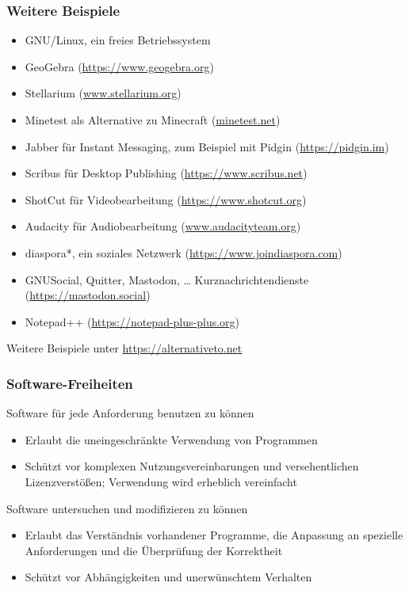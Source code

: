 \documentclass{beamer}
\begin{document}
\begin{frame}
  \frametitle{Weitere Beispiele}

  \onslide<+->

  \begin{itemize}
  \item GNU/Linux, ein freies Betriebssystem %
  \item GeoGebra (\url{https://www.geogebra.org})
  \item Stellarium (\url{www.stellarium.org})
  \item Minetest als Alternative zu Minecraft (\url{minetest.net})
  \item Jabber für Instant Messaging, zum Beispiel mit Pidgin
    (\url{https://pidgin.im})
  \item Scribus für Desktop Publishing (\url{https://www.scribus.net})
  \item ShotCut für Videobearbeitung (\url{https://www.shotcut.org})
  \item Audacity für Audiobearbeitung (\url{www.audacityteam.org})
  \item diaspora*, ein soziales Netzwerk (\url{https://www.joindiaspora.com})
  \item GNUSocial, Quitter, Mastodon, \dots{} Kurznachrichtendienste
    (\url{https://mastodon.social})
  \item Notepad++ (\url{https://notepad-plus-plus.org})
  \end{itemize}

  Weitere Beispiele unter \url{https://alternativeto.net}

\end{frame}

\begin{frame}
  \frametitle{Software-Freiheiten}

  \onslide<+->

  \begin{block}{Software für jede Anforderung benutzen zu können}
    \begin{itemize}
    \item Erlaubt die uneingeschränkte Verwendung von Programmen
    \item Schützt vor komplexen Nutzungsvereinbarungen und versehentlichen
      Lizenzverstößen; Verwendung wird erheblich vereinfacht
    \end{itemize}
  \end{block}

  \onslide<+->

  \begin{block}{Software untersuchen und modifizieren zu können}
    \begin{itemize}
    \item Erlaubt das Verständnis vorhandener Programme, die Anpassung an
      spezielle Anforderungen und die Überprüfung der Korrektheit
    \item Schützt vor Abhängigkeiten und unerwünschtem Verhalten
    \end{itemize}
  \end{block}

\end{frame}
\end{document}
